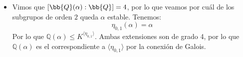 \begin{ejemplo}
\begin{itemize}
\begin{description}
            Veamos cómo se comporta $\eta_{1,0}$:
            \begin{align*}
                \eta_{1,0}(i\sqrt{2}) &= \eta_{1,0}(\alpha\beta) = \alpha\beta = i\sqrt{2}\\
                \eta_{1,0}(\sqrt{3}) &= \eta_{1,0}(\alpha^2-1) = (-\alpha)^2-1 = \alpha^2-1 = \sqrt{3}
            \end{align*}

            Por lo que $\mathbb{Q}(i\sqrt{2},\sqrt{3}) \leq K^{\langle \eta_{1,0} \rangle }$. Veamos el grado de la extensión $\mathbb{Q}\leq \bb{Q}(i\sqrt{2},\sqrt{3})$. Por el Lema de la Torre:
            \begin{equation*}
                [\mathbb{Q}(i\sqrt{2},\sqrt{3}):\mathbb{Q}] = [\mathbb{Q}(i\sqrt{2},\sqrt{3}):\mathbb{Q}(\sqrt{3})][\mathbb{Q}(\sqrt{3}):\mathbb{Q}] = 2\cdot 2 = 4
            \end{equation*}

            Por lo que $\mathbb{Q}(i\sqrt{2},\sqrt{3}) = K^{\langle \eta_{1,0} \rangle }$.
        \end{description}
        \item Vimos que $[\bb{Q}(\alpha):\bb{Q}] = 4$, por lo que veamos por cuál de los subgrupos de orden $2$ queda $\alpha$ estable. Tenemos:
        \begin{equation*}
            \eta_{0,1}(\alpha) = \alpha
        \end{equation*}
        Por lo que $\mathbb{Q}(\alpha) \leq K^{\langle \eta_{0,1} \rangle }$. Ambas extensiones son de grado 4, por lo que $\mathbb{Q}(\alpha)$ es el correspondiente a $\langle \eta_{0,1} \rangle $ por la conexión de Galois.
        

\end{itemize}
\end{ejemplo}
